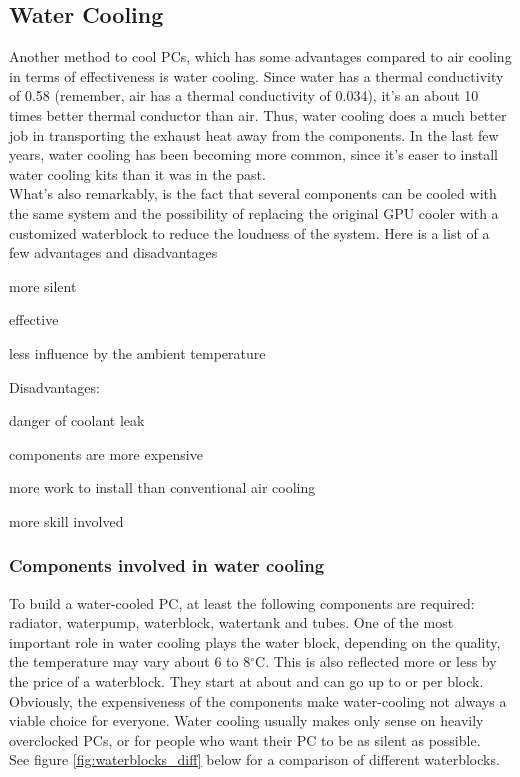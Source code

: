 \subsection{Water Cooling}

Another method to cool PCs, which has some advantages compared to air cooling in terms of effectiveness is water cooling.
Since water has a thermal conductivity of 0.58 (remember, air has a thermal conductivity of 0.034), it's an about 10 times better thermal conductor than air.
Thus, water cooling does a much better job in transporting the exhaust heat away from the components. In the last few years, water cooling has been becoming more
common, since it's easer to install water cooling kits than it was in the past. \\
What's also remarkably, is the fact that several components can be cooled with the same system and the possibility of replacing the original GPU cooler
with a customized waterblock to reduce the loudness of the system. Here is a list of a few advantages and disadvantages\\
\begin{compactitem}
\item more silent
\item effective
\item less influence by the ambient temperature \\
\end{compactitem}
Disadvantages:
\begin{compactitem}
\item danger of coolant leak
\item components are more expensive
\item more work to install than conventional air cooling
\item more skill involved \\
\end{compactitem}

\subsubsection{Components involved in water cooling}

To build a water-cooled PC, at least the following components are required: radiator, waterpump, waterblock, watertank and tubes. 
One of the most important role in water cooling plays the water block, depending on the quality, the temperature may vary about 6 to 8$^\circ$C.
This is also reflected more or less by the price of a waterblock. They start at about  and can go up to  or  per block.\\
Obviously, the expensiveness of the components make water-cooling not always a viable choice for everyone. Water cooling usually makes only sense on heavily overclocked PCs, or for people who want their PC to be as silent as possible.\\
See figure \ref{fig:waterblocks_diff} below for a comparison of different waterblocks.

